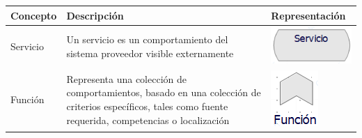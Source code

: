 \newpage
\begin{table}[h!]
\begin{center}
	\begin{tabular}{| m{6em} | m{7cm} | m{3cm} |}
		\hline
		Concepto & Descripción & Representación \\ 
		
		\hline
		Servicio
		&
		Un servicio es un comportamiento del sistema proveedor  visible  externamente 
		&
		\includegraphics[width=0.8\linewidth, height=0.05\textheight]{imgs/conceptos/meta/Servicio.PNG}
		\\
		
		\hline
		Función
		& 
		Representa una colección de comportamientos, basado en una colección de criterios específicos, tales como fuente requerida, competencias o localización   
		& \includegraphics[width=0.8\linewidth, height=0.05\textheight]{imgs/conceptos/meta/Funcion.PNG}
		\\
		

\end{tabular}
\end{center}
\end{table}
